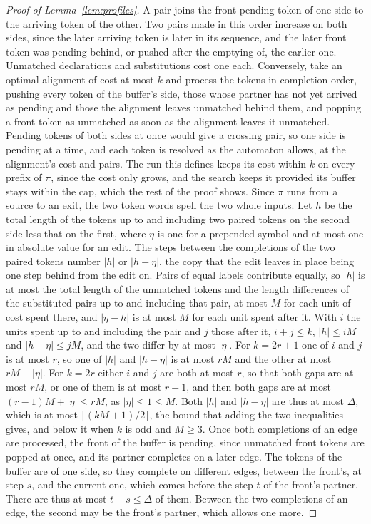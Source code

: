 \documentclass[11pt,a4paper]{article}
\theoremstyle{definition}
\theoremstyle{plain}
\begin{document}
\begin{proof}[Proof of Lemma~\ref{lem:profiles}]
A pair joins the front pending token of one side to the arriving token of the other. Two pairs made in this order
increase on both sides, since the later arriving token is later in its sequence, and the later front token was pending
behind, or pushed after the emptying of, the earlier one. Unmatched declarations and substitutions cost one each.
Conversely, take an optimal alignment of cost at most \(k\) and process the tokens in completion order, pushing every
token of the buffer's side, those whose partner has not yet arrived as pending and those the alignment leaves unmatched
behind them, and popping a front token as unmatched as soon as the alignment leaves it unmatched. Pending tokens of both
sides at once would give a crossing pair, so one side is pending at a time, and each token is resolved as the automaton
allows, at the alignment's cost and pairs. The run this defines keeps its cost within \(k\) on every prefix of \(\pi\),
since the cost only grows, and the search keeps it provided its buffer stays within the cap, which the rest of the proof
shows. Since \(\pi\) runs from a source to an exit, the two token words spell the two whole inputs. Let \(h\) be the
total length of the tokens up to and including two paired tokens on the second side less that on the first, where
\(\eta\) is one for a prepended symbol and at most one in absolute value for an edit. The steps between the completions
of the two paired tokens number \(|h|\) or \(|h - \eta|\), the copy that the edit leaves in place being one step behind
from the edit on. Pairs of equal labels contribute equally, so \(|h|\) is at most the total length of the unmatched
tokens and the length differences of the substituted pairs up to and including that pair, at most \(M\) for each unit of
cost spent there, and \(|\eta - h|\) is at most \(M\) for each unit spent after it. With \(i\) the units spent up to and
including the pair and \(j\) those after it, \(i + j \le k\), \(|h| \le iM\) and \(|h - \eta| \le jM\), and the two
differ by at most \(|\eta|\). For \(k = 2r + 1\) one of \(i\) and \(j\) is at most \(r\), so one of \(|h|\) and
\(|h - \eta|\) is at most \(rM\) and the other at most \(rM + |\eta|\). For \(k = 2r\) either \(i\) and \(j\) are both
at most \(r\), so that both gaps are at most \(rM\), or one of them is at most \(r - 1\), and then both gaps are at most
\((r - 1)M + |\eta| \le rM\), as \(|\eta| \le 1 \le M\). Both \(|h|\) and \(|h - \eta|\) are thus at most \(\Delta\),
which is at most \(\lfloor (kM + 1)/2 \rfloor\), the bound that adding the two inequalities gives, and below it when
\(k\) is odd and \(M \ge 3\). Once both completions of an edge are processed, the front of the buffer is pending, since
unmatched front tokens are popped at once, and its partner completes on a later edge. The tokens of the buffer are of
one side, so they complete on different edges, between the front's, at step \(s\), and the current one, which comes
before the step \(t\) of the front's partner. There are thus at most \(t - s \le \Delta\) of them. Between the two
completions of an edge, the second may be the front's partner, which allows one more.
\end{proof}
\end{document}
